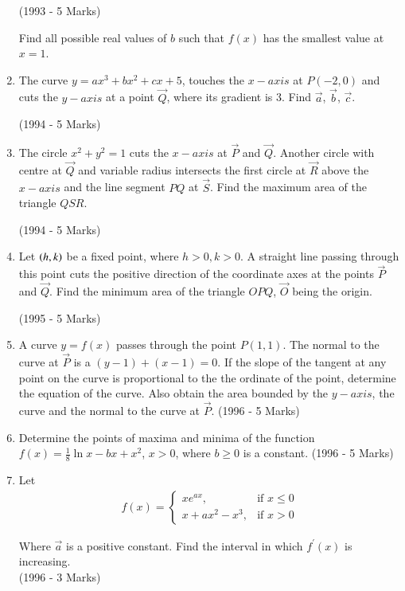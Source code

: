 \documentclass[journal,12pt,twocolumn]{IEEEtran}
\theoremstyle{remark}
\begin{document}
\begin{enumerate}
\hfill (1993 - 5 Marks)

Find all possible real values of $b$ such that $f(x)$ has the smallest value at $x=1$.

\item The curve $y = ax^3 + bx^2 + cx + 5$, touches the $x-axis$ at $P(-2,0)$ and cuts the $y-axis$ at a point $\vec{Q}$, where its gradient is 3. Find $\vec{a}$, $\vec{b}$, $\vec{c}$.

\hfill (1994 - 5 Marks)

\item The circle $x^2 + y^2 = 1$ cuts the $x-axis$ at $\vec{P}$ and $\vec{Q}$. Another circle with centre at $\vec{Q}$ and variable radius intersects the first circle at $\vec{R}$ above the $x-axis$ and the line segment $PQ$ at $\vec{S}$. Find the maximum area of the triangle $QSR$.

\hfill (1994 - 5 Marks)


\item Let $\left(h,k\right)$ be a fixed point, where $h>0, k>0$. A straight line passing through this point cuts the positive direction of the coordinate axes at the points $\vec{P}$ and $\vec{Q}$. Find the minimum area of the triangle $OPQ$, $\vec{O}$ being the origin.

\hfill{(1995 - 5 Marks)}


\item A curve $y=f(x)$ passes through the point $P(1,1)$. The normal to the curve at $\vec{P}$ is a $(y-1) + (x-1) = 0$. If the slope of the tangent at any point on the curve is proportional to the the ordinate of the point, determine the equation of the curve. Also obtain the area bounded by the $y-axis$, the curve and the normal to the curve at $\vec{P}$.
\hfill (1996 - 5 Marks)

\item Determine the points of maxima and minima of the function $f(x) = \frac{1}{8}\ln{x} - bx + x^2$, $x>0$, where $b \geq 0$ is a constant.
\hfill (1996 - 5 Marks)


\item Let 
\begin{align*}
f(x) = \begin{cases}
xe^{ax}, & \text{if } x \leq 0\\
x+ax^2 - x^3, & \text{if } x > 0
\end{cases}
\end{align*}

Where $\vec{a}$ is a positive constant. Find the interval in which $f^{\prime}(x)$ is increasing.\\
\hfill (1996 - 3 Marks)


\end{enumerate}
\end{document}

